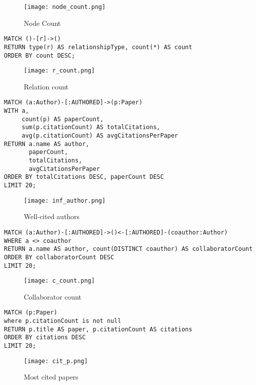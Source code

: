 \documentclass{article}
\theoremstyle{mytheoremstyle}
\theoremstyle{mytheoremstyle}
\theoremstyle{myproblemstyle}
\begin{document}
\begin{figure}[H]
    \centering
    \texttt{[image: node\_count.png]}
    \caption{Node Count}
    \label{fig:enter-label}
\end{figure}

\begin{lstlisting}[style=cypherstyle]
MATCH ()-[r]->()
RETURN type(r) AS relationshipType, count(*) AS count
ORDER BY count DESC;
\end{lstlisting}

\begin{figure}[h!]
    \centering
    \texttt{[image: r\_count.png]}
    \caption{Relation count}
    \label{fig:enter-label}
\end{figure}

\begin{lstlisting}[style=cypherstyle]
MATCH (a:Author)-[:AUTHORED]->(p:Paper)
WITH a, 
     count(p) AS paperCount,
     sum(p.citationCount) AS totalCitations,
     avg(p.citationCount) AS avgCitationsPerPaper
RETURN a.name AS author,
       paperCount,
       totalCitations,
       avgCitationsPerPaper
ORDER BY totalCitations DESC, paperCount DESC
LIMIT 20;
\end{lstlisting}

\begin{figure}[h!]
    \centering
    \texttt{[image: inf\_author.png]}
    \caption{Well-cited authors}
    \label{fig:enter-label}
\end{figure}

\begin{lstlisting}[style=cypherstyle]
MATCH (a:Author)-[:AUTHORED]->()<-[:AUTHORED]-(coauthor:Author)
WHERE a <> coauthor
RETURN a.name AS author, count(DISTINCT coauthor) AS collaboratorCount
ORDER BY collaboratorCount DESC
LIMIT 20;
\end{lstlisting}

\begin{figure}[h!]
    \centering
    \texttt{[image: c\_count.png]}
    \caption{Collaborator count}
    \label{fig:enter-label}
\end{figure}

\begin{lstlisting}[style=cypherstyle]
MATCH (p:Paper)
where p.citationCount is not null
RETURN p.title AS paper, p.citationCount AS citations
ORDER BY citations DESC
LIMIT 20;
\end{lstlisting}

\begin{figure}[h!]
    \centering
    \texttt{[image: cit\_p.png]}
    \caption{Most cited papers}
    \label{fig:enter-label}
\end{figure}
\end{document}

